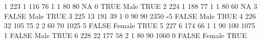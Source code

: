 \documentclass[
]{article}
\newenvironment{Shaded}{\begin{snugshade}}{\end{snugshade}}
\newcommand{\ConstantTok}[1]{\textcolor[rgb]{0.56,0.35,0.01}{#1}}
\newcommand{\DecValTok}[1]{\textcolor[rgb]{0.00,0.00,0.81}{#1}}
\newcommand{\NormalTok}[1]{#1}
\newcommand{\SpecialCharTok}[1]{\textcolor[rgb]{0.81,0.36,0.00}{\textbf{#1}}}
\begin{document}
\begin{Shaded}
\begin{Highlighting}[]
\DecValTok{1} \DecValTok{223}         \DecValTok{1}   \DecValTok{116}    \DecValTok{76}     \DecValTok{1}       \DecValTok{1}       \DecValTok{80}        \DecValTok{80}       \ConstantTok{NA}       \DecValTok{0} \ConstantTok{TRUE}\NormalTok{  Male   }\ConstantTok{TRUE}           
\DecValTok{2} \DecValTok{224}         \DecValTok{1}   \DecValTok{188}    \DecValTok{77}     \DecValTok{1}       \DecValTok{1}       \DecValTok{80}        \DecValTok{60}       \ConstantTok{NA}       \DecValTok{3} \ConstantTok{FALSE}\NormalTok{ Male   }\ConstantTok{TRUE}           
\DecValTok{3} \DecValTok{225}        \DecValTok{13}   \DecValTok{191}    \DecValTok{39}     \DecValTok{1}       \DecValTok{0}       \DecValTok{90}        \DecValTok{90}     \DecValTok{2350}      \SpecialCharTok{{-}}\DecValTok{5} \ConstantTok{FALSE}\NormalTok{ Male   }\ConstantTok{TRUE}           
\DecValTok{4} \DecValTok{226}        \DecValTok{32}   \DecValTok{105}    \DecValTok{75}     \DecValTok{2}       \DecValTok{2}       \DecValTok{60}        \DecValTok{70}     \DecValTok{1025}       \DecValTok{5} \ConstantTok{FALSE}\NormalTok{ Female }\ConstantTok{TRUE}           
\DecValTok{5} \DecValTok{227}         \DecValTok{6}   \DecValTok{174}    \DecValTok{66}     \DecValTok{1}       \DecValTok{1}       \DecValTok{90}       \DecValTok{100}     \DecValTok{1075}       \DecValTok{1} \ConstantTok{FALSE}\NormalTok{ Male   }\ConstantTok{TRUE}           
\DecValTok{6} \DecValTok{228}        \DecValTok{22}   \DecValTok{177}    \DecValTok{58}     \DecValTok{2}       \DecValTok{1}       \DecValTok{80}        \DecValTok{90}     \DecValTok{1060}       \DecValTok{0} \ConstantTok{FALSE}\NormalTok{ Female }\ConstantTok{TRUE}           
\end{Highlighting}
\end{Shaded}
\end{document}
